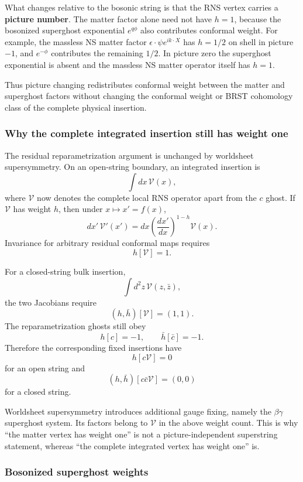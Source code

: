\documentclass[
  10pt,
  a4paper,
  openany]{book}
\begin{document}
What changes relative to the bosonic string is that the RNS vertex
carries a \textbf{picture number}. The matter factor alone need not have
\(h=1\), because the bosonized superghost exponential \(e^{q\phi}\) also
contributes conformal weight. For example, the massless NS matter factor
\(\epsilon\cdot\psi e^{ik\cdot X}\) has \(h=1/2\) on shell in picture
\(-1\), and \(e^{-\phi}\) contributes the remaining \(1/2\). In picture
zero the superghost exponential is absent and the massless NS matter
operator itself has \(h=1\).

Thus picture changing redistributes conformal weight between the matter
and superghost factors without changing the conformal weight or BRST
cohomology class of the complete physical insertion.

\subsubsection{Why the complete integrated insertion still has weight
one}\label{why-the-complete-integrated-insertion-still-has-weight-one}

The residual reparametrization argument is unchanged by worldsheet
supersymmetry. On an open-string boundary, an integrated insertion is \[
\int dx\,\mathcal V(x),
\] where \(\mathcal V\) now denotes the complete local RNS operator
apart from the \(c\) ghost. If \(\mathcal V\) has weight \(h\), then
under \(x\mapsto x'=f(x)\), \[
dx'\,\mathcal V'(x')
=dx\left(\frac{dx'}{dx}\right)^{1-h}\mathcal V(x).
\] Invariance for arbitrary residual conformal maps requires \[
h[\mathcal V]=1.
\]

For a closed-string bulk insertion, \[
\int d^2z\,\mathcal V(z,\bar z),
\] the two Jacobians require \[
(h,\bar h)[\mathcal V]=(1,1).
\] The reparametrization ghosts still obey \[
h[c]=-1,
\qquad
\bar h[\bar c]=-1.
\] Therefore the corresponding fixed insertions have \[
h[c\mathcal V]=0
\] for an open string and \[
(h,\bar h)[c\bar c\mathcal V]=(0,0)
\] for a closed string.

Worldsheet supersymmetry introduces additional gauge fixing, namely the
\(\beta\gamma\) superghost system. Its factors belong to \(\mathcal V\)
in the above weight count. This is why ``the matter vertex has weight
one'' is not a picture-independent superstring statement, whereas ``the
complete integrated vertex has weight one'' is.

\subsubsection{Bosonized superghost
weights}\label{bosonized-superghost-weights}
\end{document}
